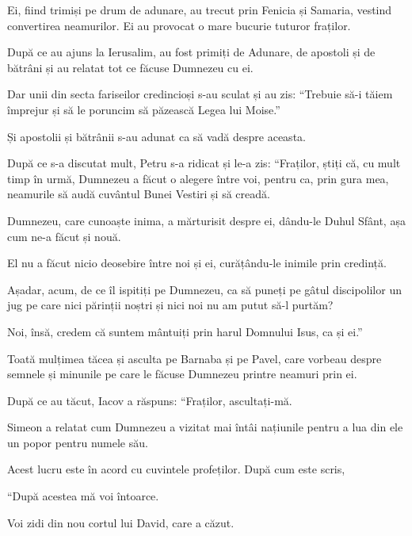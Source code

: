 {Ei, fiind trimiși pe drum de adunare, au trecut prin Fenicia și Samaria, vestind convertirea neamurilor. Ei au provocat o mare bucurie tuturor fraților.

După ce au ajuns la Ierusalim, au fost primiți de Adunare, de apostoli și de bătrâni și au relatat tot ce făcuse Dumnezeu cu ei.


\par }{\PP {}Dar unii din secta fariseilor credincioși s-au sculat și au zis: “Trebuie să-i tăiem împrejur și să le poruncim să păzească Legea lui Moise.”


\par }{\PP {}Și apostolii și bătrânii s-au adunat ca să vadă despre aceasta.

După ce s-a discutat mult, Petru s-a ridicat și le-a zis: “Fraților, știți că, cu mult timp în urmă, Dumnezeu a făcut o alegere între voi, pentru ca, prin gura mea, neamurile să audă cuvântul Bunei Vestiri și să creadă.

Dumnezeu, care cunoaște inima, a mărturisit despre ei, dându-le Duhul Sfânt, așa cum ne-a făcut și nouă.

El nu a făcut nicio deosebire între noi și ei, curățându-le inimile prin credință.

Așadar, acum, de ce îl ispitiți pe Dumnezeu, ca să puneți pe gâtul discipolilor un jug pe care nici părinții noștri și nici noi nu am putut să-l purtăm?

Noi, însă, credem că suntem mântuiți prin harul Domnului Isus, ca și ei.”


\par }{\PP {}Toată mulțimea tăcea și asculta pe Barnaba și pe Pavel, care vorbeau despre semnele și minunile pe care le făcuse Dumnezeu printre neamuri prin ei.

După ce au tăcut, Iacov a răspuns: “Fraților, ascultați-mă.

Simeon a relatat cum Dumnezeu a vizitat mai întâi națiunile pentru a lua din ele un popor pentru numele său.

Acest lucru este în acord cu cuvintele profeților. După cum este scris,


\par }{\Q {}“După acestea mă voi întoarce.

\par }{\Q Voi zidi din nou cortul lui David, care a căzut.

}
